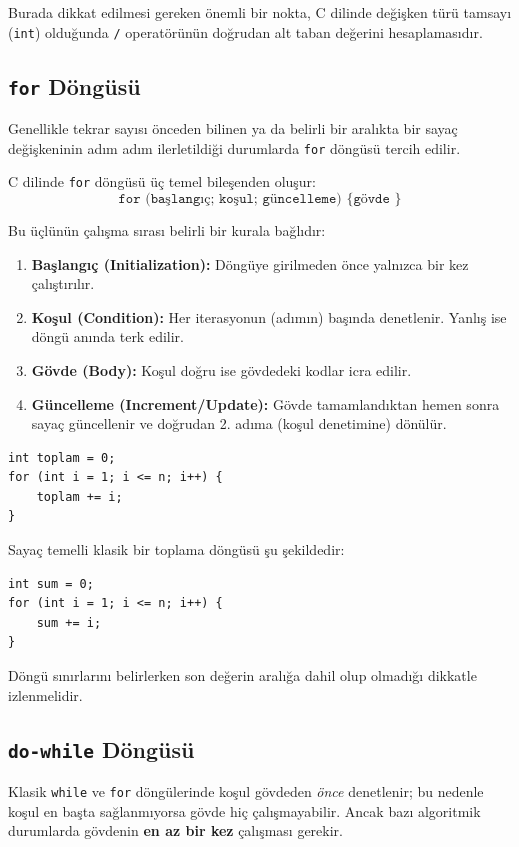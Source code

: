 Burada dikkat edilmesi gereken önemli bir nokta, C dilinde değişken türü tamsayı (\texttt{int}) olduğunda \texttt{/} operatörünün doğrudan alt taban değerini hesaplamasıdır.

\subsection{\texttt{for} Döngüsü}

Genellikle tekrar sayısı önceden bilinen ya da belirli bir aralıkta bir sayaç değişkeninin adım adım ilerletildiği durumlarda \texttt{for} döngüsü tercih edilir. 

C dilinde \texttt{for} döngüsü üç temel bileşenden oluşur:
\[
\texttt{for (başlangıç; koşul; güncelleme) \{ gövde \}}
\]

Bu üçlünün çalışma sırası belirli bir kurala bağlıdır:
\begin{enumerate}
    \item \textbf{Başlangıç (Initialization):} Döngüye girilmeden önce yalnızca bir kez çalıştırılır.
    \item \textbf{Koşul (Condition):} Her iterasyonun (adımın) başında denetlenir. Yanlış ise döngü anında terk edilir.
    \item \textbf{Gövde (Body):} Koşul doğru ise gövdedeki kodlar icra edilir.
    \item \textbf{Güncelleme (Increment/Update):} Gövde tamamlandıktan hemen sonra sayaç güncellenir ve doğrudan 2. adıma (koşul denetimine) dönülür.
\end{enumerate}

\begin{lstlisting}[language=CTemel]
int toplam = 0;
for (int i = 1; i <= n; i++) {
    toplam += i;
}
\end{lstlisting}

Sayaç temelli klasik bir toplama döngüsü şu şekildedir:

\begin{lstlisting}[language=CTemel]
int sum = 0;
for (int i = 1; i <= n; i++) {
    sum += i;
}\end{lstlisting}

Döngü sınırlarını belirlerken son değerin aralığa dahil olup olmadığı dikkatle izlenmelidir.

\subsection{\texttt{do-while} Döngüsü}

Klasik \texttt{while} ve \texttt{for} döngülerinde koşul gövdeden \emph{önce} denetlenir; bu nedenle koşul en başta sağlanmıyorsa gövde hiç çalışmayabilir. Ancak bazı algoritmik durumlarda gövdenin \textbf{en az bir kez} çalışması gerekir.

